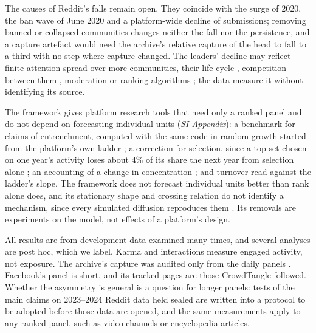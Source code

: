 \documentclass[9pt,twocolumn,twoside]{pnas-new}
\newif\iffinal \finalfalse
\begin{document}
The causes of Reddit's falls remain open. They coincide with the surge of 2020, the ban wave of June 2020 and a platform-wide decline of submissions; removing banned or collapsed communities changes neither the fall nor the persistence, and a capture artefact would need the archive's relative capture of the head to fall to a third with no step where capture changed. The leaders' decline may reflect finite attention spread over more communities, their life cycle \cite{halfaker2013,teblunthuis2018}, competition between them \cite{teblunthuis2025}, moderation or ranking algorithms \cite{huszar2022}; the data measure it without identifying its source.

The framework gives platform research tools that need only a ranked panel and do not depend on forecasting individual units (\textit{SI Appendix}): a benchmark for claims of entrenchment, computed with the same code in random growth started from the platform's own ladder \cite{sutton2007}; a correction for selection, since a top set chosen on one year's activity loses about 4\% of its share the next year from selection alone \cite{quah1993}; an accounting of a change in concentration \cite{gomez2023,fernholzkoch2021}; and turnover read against the ladder's slope. The framework does not forecast individual units better than rank alone does, and its stationary shape and crossing relation do not identify a mechanism, since every simulated diffusion reproduces them \cite{salganik2006,stumpf2012}. Its removals are experiments on the model, not effects of a platform's design.

All results are from development data examined many times, and several analyses are post hoc, which we label. Karma and interactions measure engaged activity, not exposure. The archive's capture was audited only from the daily panels \cite{gaffney2018}. Facebook's panel is short, and its tracked pages are those CrowdTangle followed. Whether the asymmetry is general is a question for longer panels: tests of the main claims on 2023--2024 Reddit data held sealed are written into a protocol to be adopted before those data are opened, and the same measurements apply to any ranked panel, such as video channels or encyclopedia articles. \iffinal That test, and the comparison with web traffic in ref.~\cite{hindman2018}, will show how far the balance found here transfers across platforms and decades. \fi
\end{document}
